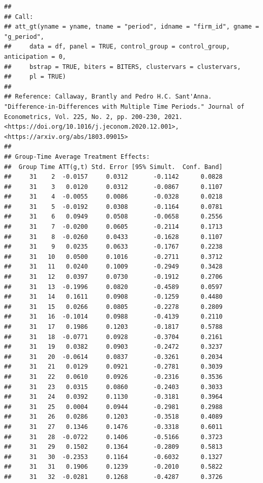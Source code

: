 \documentclass[
]{article}
\begin{document}
\begin{verbatim}
## 
## Call:
## att_gt(yname = yname, tname = "period", idname = "firm_id", gname = "g_period", 
##     data = df, panel = TRUE, control_group = control_group, anticipation = 0, 
##     bstrap = TRUE, biters = BITERS, clustervars = clustervars, 
##     pl = TRUE)
## 
## Reference: Callaway, Brantly and Pedro H.C. Sant'Anna.  "Difference-in-Differences with Multiple Time Periods." Journal of Econometrics, Vol. 225, No. 2, pp. 200-230, 2021. <https://doi.org/10.1016/j.jeconom.2020.12.001>, <https://arxiv.org/abs/1803.09015> 
## 
## Group-Time Average Treatment Effects:
##  Group Time ATT(g,t) Std. Error [95% Simult.  Conf. Band]  
##     31    2  -0.0157     0.0312       -0.1142      0.0828  
##     31    3   0.0120     0.0312       -0.0867      0.1107  
##     31    4  -0.0055     0.0086       -0.0328      0.0218  
##     31    5  -0.0192     0.0308       -0.1164      0.0781  
##     31    6   0.0949     0.0508       -0.0658      0.2556  
##     31    7  -0.0200     0.0605       -0.2114      0.1713  
##     31    8  -0.0260     0.0433       -0.1628      0.1107  
##     31    9   0.0235     0.0633       -0.1767      0.2238  
##     31   10   0.0500     0.1016       -0.2711      0.3712  
##     31   11   0.0240     0.1009       -0.2949      0.3428  
##     31   12   0.0397     0.0730       -0.1912      0.2706  
##     31   13  -0.1996     0.0820       -0.4589      0.0597  
##     31   14   0.1611     0.0908       -0.1259      0.4480  
##     31   15   0.0266     0.0805       -0.2278      0.2809  
##     31   16  -0.1014     0.0988       -0.4139      0.2110  
##     31   17   0.1986     0.1203       -0.1817      0.5788  
##     31   18  -0.0771     0.0928       -0.3704      0.2161  
##     31   19   0.0382     0.0903       -0.2472      0.3237  
##     31   20  -0.0614     0.0837       -0.3261      0.2034  
##     31   21   0.0129     0.0921       -0.2781      0.3039  
##     31   22   0.0610     0.0926       -0.2316      0.3536  
##     31   23   0.0315     0.0860       -0.2403      0.3033  
##     31   24   0.0392     0.1130       -0.3181      0.3964  
##     31   25   0.0004     0.0944       -0.2981      0.2988  
##     31   26   0.0286     0.1203       -0.3518      0.4089  
##     31   27   0.1346     0.1476       -0.3318      0.6011  
##     31   28  -0.0722     0.1406       -0.5166      0.3723  
##     31   29   0.1502     0.1364       -0.2809      0.5813  
##     31   30  -0.2353     0.1164       -0.6032      0.1327  
##     31   31   0.1906     0.1239       -0.2010      0.5822  
##     31   32  -0.0281     0.1268       -0.4287      0.3726  

\end{verbatim}
\end{document}
